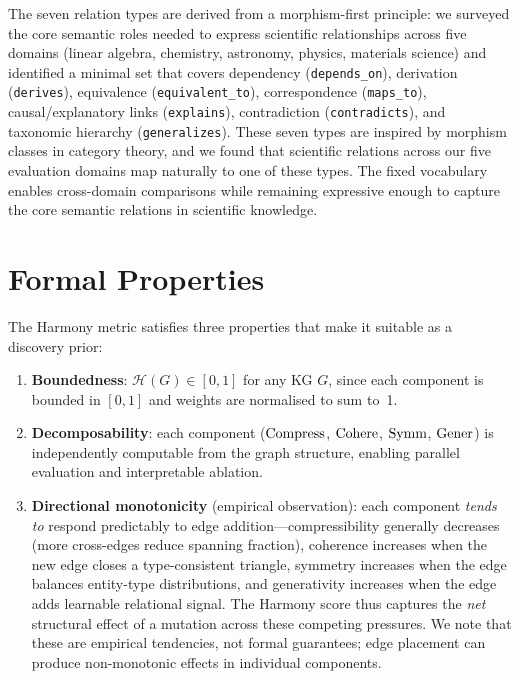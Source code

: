 The seven relation types are derived from a morphism-first principle: we surveyed
the core semantic roles needed to express scientific relationships across five
domains (linear algebra, chemistry, astronomy, physics, materials science) and
identified a minimal set that covers dependency (\texttt{depends\_on}),
derivation (\texttt{derives}), equivalence (\texttt{equivalent\_to}),
correspondence (\texttt{maps\_to}), causal/explanatory links
(\texttt{explains}), contradiction (\texttt{contradicts}), and taxonomic
hierarchy (\texttt{generalizes}).  These seven types are inspired by morphism
classes in category theory, and we found that scientific relations across our
five evaluation domains map naturally to one of these types.  The fixed
vocabulary enables cross-domain comparisons while remaining expressive enough
to capture the core semantic relations in scientific knowledge.

\section{Formal Properties}\label{app:formal-properties}

The Harmony metric satisfies three properties that make it suitable as a
discovery prior:
\begin{enumerate}[nosep]
  \item \textbf{Boundedness}: $\mathcal{H}(G) \in [0, 1]$ for any KG $G$,
    since each component is bounded in $[0,1]$ and weights are normalised to
    sum to~1.
  \item \textbf{Decomposability}: each component
    ($\operatorname{Compress}$, $\operatorname{Cohere}$, $\operatorname{Symm}$, $\operatorname{Gener}$) is independently computable
    from the graph structure, enabling parallel evaluation and interpretable
    ablation.
  \item \textbf{Directional monotonicity} (empirical observation): each
    component \emph{tends to} respond predictably to edge
    addition---compressibility generally decreases (more cross-edges reduce
    spanning fraction), coherence increases when the new edge closes a
    type-consistent triangle, symmetry increases when the edge balances
    entity-type distributions, and generativity increases when the edge adds
    learnable relational signal.  The Harmony score thus captures the
    \emph{net} structural effect of a mutation across these competing
    pressures.  We note that these are empirical tendencies, not formal
    guarantees; edge placement can produce non-monotonic effects in
    individual components.
\end{enumerate}


